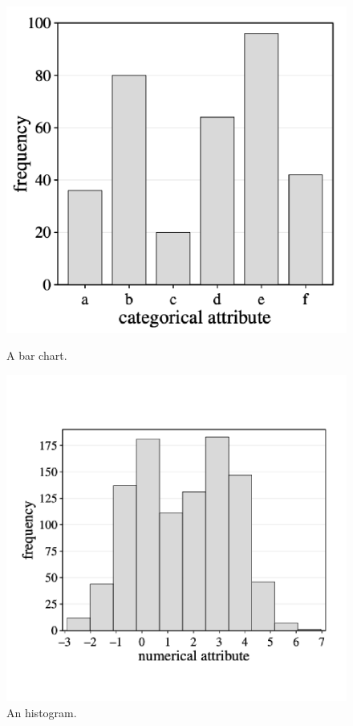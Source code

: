 \begin{figure}[h]
    \centering
    \begin{minipage}[b]{0.40\textwidth}
        \includegraphics[width=\textwidth]{img/bar chart.png}
        \caption{A bar chart.}
    \end{minipage}
    \hfill
    \begin{minipage}[b]{0.45\textwidth}
        \includegraphics[width=\textwidth]{img/histogram.png}
        \caption{An histogram.}
    \end{minipage}
\end{figure}

